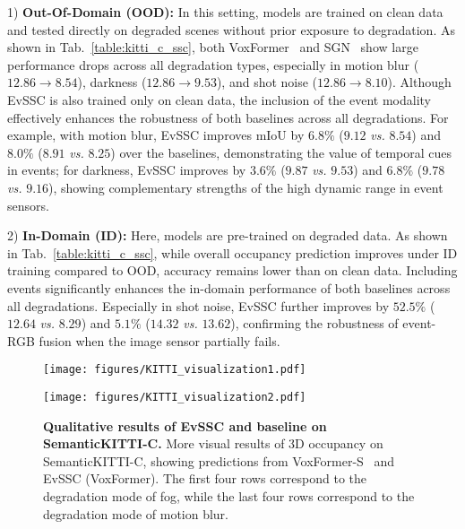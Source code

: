 1) \textbf{Out-Of-Domain (OOD):} 
In this setting, models are trained on clean data and tested directly on degraded scenes without prior exposure to degradation. 
As shown in Tab.~\ref{table:kitti_c_ssc}, both VoxFormer~\cite{li2023voxformer} and SGN~\cite{mei2024sgn} show large performance drops across all degradation types, especially in motion blur ($12.86{\rightarrow}8.54$), darkness ($12.86{\rightarrow}9.53$), and shot noise ($12.86{\rightarrow}8.10$). 
Although EvSSC is also trained only on clean data, the inclusion of the event modality effectively enhances the robustness of both baselines across all degradations. 
For example, with motion blur, EvSSC improves mIoU by $6.8\%$ ($9.12$ \textit{vs.} $8.54$) and $8.0\%$ ($8.91$ \textit{vs.} $8.25$) over the baselines, demonstrating the value of temporal cues in events; for darkness, EvSSC improves by $3.6\%$ ($9.87$ \textit{vs.} $9.53$) and $6.8\%$ ($9.78$ \textit{vs.} $9.16$), showing complementary strengths of the high dynamic range in event sensors.

2) \textbf{In-Domain (ID):} Here, models are pre-trained on degraded data. 
As shown in Tab.~\ref{table:kitti_c_ssc}, while overall occupancy prediction improves under ID training compared to OOD, accuracy remains lower than on clean data. 
Including events significantly enhances the in-domain performance of both baselines across all degradations. 
%
Especially in shot noise, EvSSC further improves by $52.5\%$ ($12.64$ \textit{vs.} $8.29$) and $5.1\%$ ($14.32$ \textit{vs.} $13.62$), confirming the robustness of event-RGB fusion when the image sensor partially fails.
%

%
\begin{figure*}[t!]
\centering
\begin{minipage}{1\linewidth}
    \centering
    \texttt{[image: figures/KITTI\_visualization1.pdf]}
\end{minipage}


\begin{minipage}{1\linewidth}
    \centering
    \texttt{[image: figures/KITTI\_visualization2.pdf]}
\end{minipage}
\caption{\textbf{Qualitative results of EvSSC and baseline on SemanticKITTI-C.} More visual results of 3D occupancy on SemanticKITTI-C, showing predictions from VoxFormer-S~\cite{li2023voxformer} and EvSSC (VoxFormer). The first four rows correspond to the degradation mode of fog, while the last four rows correspond to the degradation mode of motion blur.}
\label{fig:corruption_v}
\end{figure*}
